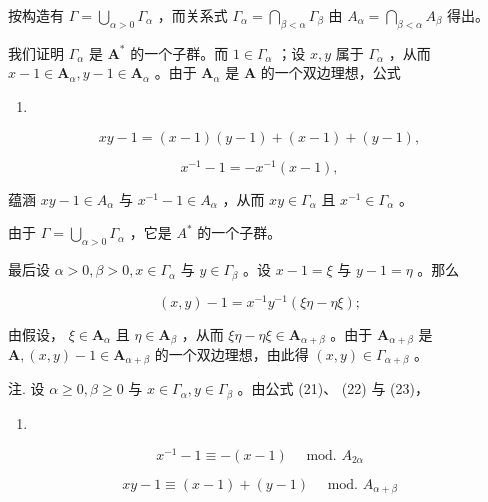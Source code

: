 按构造有 \(\Gamma = \bigcup_{\alpha > 0} \Gamma_{\alpha}\) ，而关系式 \(\Gamma_{\alpha} = \bigcap_{\beta < \alpha} \Gamma_{\beta}\) 由 \(A_{\alpha} = \bigcap_{\beta < \alpha} A_{\beta}\) 得出。

我们证明 \(\Gamma_{\alpha}\) 是 \(\mathbf{A}^*\) 的一个子群。而 \(1 \in \Gamma_{\alpha}\) ；设 \(x, y\) 属于 \(\Gamma_{\alpha}\) ，从而 \(x - 1 \in \mathbf{A}_{\alpha}, y - 1 \in \mathbf{A}_{\alpha}\) 。由于 \(\mathbf{A}_{\alpha}\) 是 \(\mathbf{A}\) 的一个双边理想，公式

\begin{enumerate}
\def\labelenumi{(\arabic{enumi})}
\setcounter{enumi}{20}
\tightlist
\item
\end{enumerate}

\[
x y - 1 = (x - 1) (y - 1) + (x - 1) + (y - 1),\tag{21}
\]

\[
x ^ {- 1} - 1 = - x ^ {- 1} (x - 1),\tag{22}
\]

蕴涵 \(xy - 1 \in A_{\alpha}\) 与 \(x^{-1} - 1 \in A_{\alpha}\) ，从而 \(xy \in \Gamma_{\alpha}\) 且 \(x^{-1} \in \Gamma_{\alpha}\) 。

由于 \(\Gamma = \bigcup_{\alpha > 0} \Gamma_{\alpha}\) ，它是 \(A^{*}\) 的一个子群。

最后设 \(\alpha > 0, \beta > 0, x \in \Gamma_{\alpha}\) 与 \(y \in \Gamma_{\beta}\) 。设 \(x - 1 = \xi\) 与 \(y - 1 = \eta\) 。那么

\[
(x, y) - 1 = x ^ {- 1} y ^ {- 1} (\xi \eta - \eta \xi);\tag{23}
\]

由假设， \(\xi \in \mathbf{A}_{\alpha}\) 且 \(\eta \in \mathbf{A}_{\beta}\) ，从而 \(\xi \eta - \eta \xi \in \mathbf{A}_{\alpha + \beta}\) 。由于 \(\mathbf{A}_{\alpha + \beta}\) 是 \(\mathbf{A}, (x, y) - 1 \in \mathbf{A}_{\alpha + \beta}\) 的一个双边理想，由此得 \((x, y) \in \Gamma_{\alpha + \beta}\) 。

注. 设 \(\alpha \geqslant 0, \beta \geqslant 0\) 与 \(x \in \Gamma_{\alpha}, y \in \Gamma_{\beta}\) 。由公式 (21)、 (22) 与 (23)，

\begin{enumerate}
\def\labelenumi{(\arabic{enumi})}
\setcounter{enumi}{23}
\tightlist
\item
\end{enumerate}

\[
x ^ {- 1} - 1 \equiv - (x - 1) \quad \text { mod. } A _ {2 \alpha}\tag{24}
\]

\[
x y - 1 \equiv (x - 1) + (y - 1) \quad \text { mod. } A _ {\alpha + \beta}\tag{25}
\]


